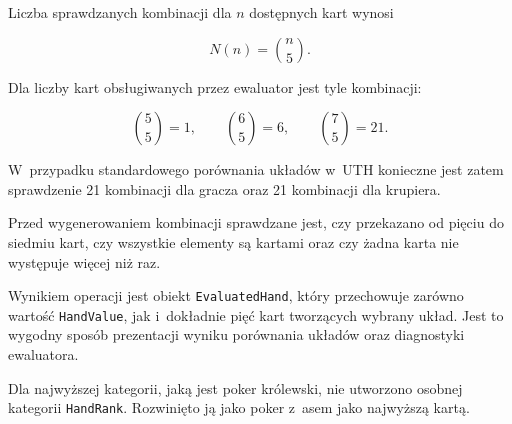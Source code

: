 Liczba sprawdzanych kombinacji dla \(n\) dostępnych kart wynosi

\begin{equation}
    N(n) = \binom{n}{5}.
\end{equation}

Dla liczby kart obsługiwanych przez ewaluator jest tyle kombinacji:

\begin{equation}
    \binom{5}{5} = 1,
    \qquad
    \binom{6}{5} = 6,
    \qquad
    \binom{7}{5} = 21.
\end{equation}

W~przypadku standardowego porównania układów w~UTH konieczne jest zatem sprawdzenie
21 kombinacji dla gracza oraz 21 kombinacji dla krupiera.

Przed wygenerowaniem kombinacji sprawdzane jest, czy przekazano od pięciu
do siedmiu kart, czy wszystkie elementy są kartami oraz czy żadna karta
nie występuje więcej niż raz.

Wynikiem operacji jest obiekt \texttt{EvaluatedHand}, który przechowuje
zarówno wartość \texttt{HandValue}, jak i~dokładnie pięć kart tworzących
wybrany układ. Jest to wygodny sposób prezentacji wyniku porównania układów oraz diagnostyki ewaluatora.

Dla najwyższej kategorii, jaką jest poker królewski, nie utworzono osobnej kategorii \texttt{HandRank}.
Rozwinięto ją jako poker z~asem jako najwyższą kartą.
